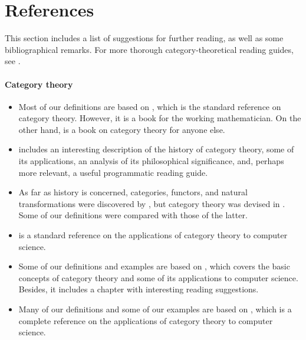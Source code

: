 \section*{References}
\label{sec:introduction-references}

This section includes a list of suggestions for further reading, as
well as some bibliographical remarks. For more thorough
category-theoretical reading guides, see
\parencites[48--56]{marquis-2013}[§ 4]{pierce-1991}.

\paragraph{Category theory}

\begin{itemize}
\item
  Most of our definitions are based on \parencite{maclane-1998}, which
  is the standard reference on category theory. However, it is a book
  for the working mathematician. On the other hand,
  \parencite{awodey-2010} is a book on category theory for anyone
  else.

\item
  \textcite{marquis-2013} includes an interesting description of the
  history of category theory, some of its applications, an analysis of
  its philosophical significance, and, perhaps more relevant, a useful
  programmatic reading guide.

\item
  As far as history is concerned, categories, functors, and natural
  transformations were discovered by
  \textcite{eilenberg-maclane-1942}, but category theory was devised
  in \parencite{eilenberg-maclane-1945}. Some of our definitions were
  compared with those of the latter.

\item
  \textcite{bird-demoor-1997} is a standard reference on the
  applications of category theory to computer science.

\item
  Some of our definitions and examples are based on
  \parencite{pierce-1991}, which covers the basic concepts of category
  theory and some of its applications to computer science. Besides, it
  includes a chapter with interesting reading suggestions.

\item
  Many of our definitions and some of our examples are based on
  \parencite{poigne-1992}, which is a complete reference on the
  applications of category theory to computer science.


\end{itemize}

